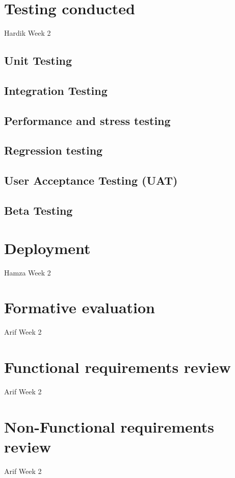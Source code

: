 \section{Testing conducted}
Hardik Week 2

\subsection{Unit Testing}


\subsection{Integration Testing}


\subsection{Performance and stress testing}


\subsection{Regression testing}


\subsection{User Acceptance Testing (UAT)}


\subsection{Beta Testing}


\section{Deployment}
Hamza Week 2

\section{Formative evaluation}
Arif Week 2

\section{Functional requirements review}
Arif Week 2

\section{Non-Functional requirements review}
Arif Week 2